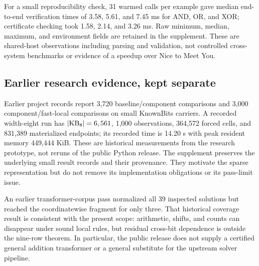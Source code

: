 For a small reproducibility check, 31 warmed calls per example gave median end-to-end verification times of 3.58, 5.61, and 7.45 ms for AND, OR, and XOR; certificate checking took 1.58, 2.14, and 3.26 ms. Raw minimum, median, maximum, and environment fields are retained in the supplement. These are shared-host observations including parsing and validation, not controlled cross-system benchmarks or evidence of a speedup over Nice to Meet You.

\subsection{Earlier research evidence, kept separate}
Earlier project records report 3,720 baseline/component comparisons and 3,000 component/fast-local comparisons on small KnownBits carriers. A recorded width-eight run has $|\mathrm{KB}_8|=6,561$, 1,000 observations, 364,572 forced cells, and 831,389 materialized endpoints; its recorded time is 14.20 s with peak resident memory 449,444 KiB. These are historical measurements from the research prototype, not reruns of the public Python release. The supplement preserves the underlying small result records and their provenance. They motivate the sparse representation but do not remove its implementation obligations or its pass-limit issue.

An earlier transformer-corpus pass normalized all 39 inspected solutions but reached the coordinatewise fragment for only three. That historical coverage result is consistent with the present scope: arithmetic, shifts, and counts can disappear under sound local rules, but residual cross-bit dependence is outside the nine-row theorem. In particular, the public release does not supply a certified general addition transformer or a general substitute for the upstream solver pipeline.

